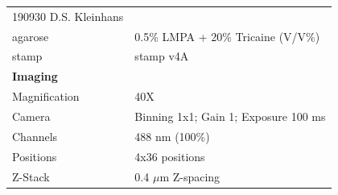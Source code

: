 \documentclass[11pt,singlespacinge,twoside]{reedthesis} %
\begin{document}
\begin{longtable}[]{@{}ll@{}}
\begin{minipage}[t]{0.73\columnwidth}
190930 D.S. Kleinhans\strut
\end{minipage}\tabularnewline
\begin{minipage}[t]{0.21\columnwidth}\raggedright
agarose\strut
\end{minipage} & \begin{minipage}[t]{0.73\columnwidth}\raggedright
0.5\% LMPA + 20\% Tricaine (V/V\%)\strut
\end{minipage}\tabularnewline
\begin{minipage}[t]{0.21\columnwidth}\raggedright
stamp\strut
\end{minipage} & \begin{minipage}[t]{0.73\columnwidth}\raggedright
stamp v4A\strut
\end{minipage}\tabularnewline
\begin{minipage}[t]{0.21\columnwidth}\raggedright
\textbf{Imaging}\strut
\end{minipage} & \begin{minipage}[t]{0.73\columnwidth}\raggedright
\strut
\end{minipage}\tabularnewline
\begin{minipage}[t]{0.21\columnwidth}\raggedright
Magnification\strut
\end{minipage} & \begin{minipage}[t]{0.73\columnwidth}\raggedright
40X\strut
\end{minipage}\tabularnewline
\begin{minipage}[t]{0.21\columnwidth}\raggedright
Camera\strut
\end{minipage} & \begin{minipage}[t]{0.73\columnwidth}\raggedright
Binning 1x1; Gain 1; Exposure 100 ms\strut
\end{minipage}\tabularnewline
\begin{minipage}[t]{0.21\columnwidth}\raggedright
Channels\strut
\end{minipage} & \begin{minipage}[t]{0.73\columnwidth}\raggedright
488 nm (100\%)\strut
\end{minipage}\tabularnewline
\begin{minipage}[t]{0.21\columnwidth}\raggedright
Positions\strut
\end{minipage} & \begin{minipage}[t]{0.73\columnwidth}\raggedright
4x36 positions\strut
\end{minipage}\tabularnewline
\begin{minipage}[t]{0.21\columnwidth}\raggedright
Z-Stack\strut
\end{minipage} & \begin{minipage}[t]{0.73\columnwidth}\raggedright
0.4 \(\mu\)m Z-spacing\strut
\end{minipage}\tabularnewline
\bottomrule
\end{longtable}
\end{document}
